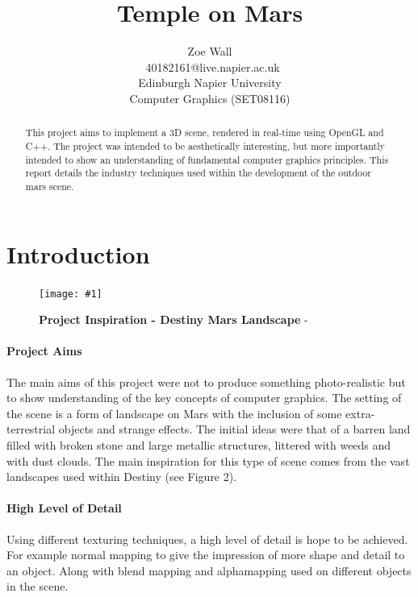 \documentclass[conference]{acmsiggraph}
\title{Temple on Mars}
\author{Zoe Wall \\\ 40182161@live.napier.ac.uk \\
Edinburgh Napier University \\
Computer Graphics (SET08116)}
\newcommand{\figuremacroW}[4]{
	\begin{figure}[h] %
		\centering
		\texttt{[image: \#1]}
		\caption[#2]{\textbf{#2} - #3}
		\label{fig:#1}
	\end{figure}
}
\begin{document}

\maketitle

\begin{abstract}
This project aims to implement a 3D scene, rendered in real-time using OpenGL and C++. The project was intended to be aesthetically interesting, but more importantly intended to show an understanding of fundamental computer graphics principles. This report details the industry techniques used within the development of the outdoor mars scene.
\end{abstract}

\keywordlist

\section{Introduction}

\figuremacroW
{DestinyMars1}
{Project Inspiration - Destiny Mars Landscape}
{\protect\cite{Destiny}}
{1.0}

\paragraph{Project Aims}The main aims of this project were not to produce something photo-realistic but to show understanding of the key concepts of computer graphics. The setting of the scene is a form of landscape on Mars with the inclusion of some extra-terrestrial objects and strange effects. The initial ideas were that of a barren land filled with broken stone and large metallic structures, littered with weeds and with dust clouds. The main inspiration for this type of scene comes from the vast landscapes used within Destiny (see Figure 2).

\paragraph{High Level of Detail} Using different texturing techniques, a high level of detail is hope to be achieved. For example normal mapping to give the impression of more shape and detail to an object. Along with blend mapping and alphamapping used on different objects in the scene.
\end{document}
